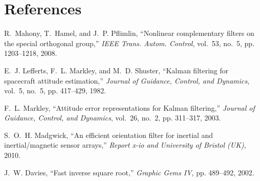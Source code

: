 \documentclass[12pt]{article}
\begin{document}
\section*{References}
\begin{thebibliography}{9}
R.~Mahony, T.~Hamel, and J.~P. Pflimlin, “Nonlinear complementary filters on the special orthogonal group,” \emph{IEEE Trans. Autom. Control}, vol.~53, no.~5, pp. 1203–1218, 2008.

E.~J. Lefferts, F.~L. Markley, and M.~D. Shuster, “Kalman filtering for spacecraft attitude estimation,” \emph{Journal of Guidance, Control, and Dynamics}, vol.~5, no.~5, pp. 417–429, 1982.

F.~L. Markley, “Attitude error representations for Kalman filtering,” \emph{Journal of Guidance, Control, and Dynamics}, vol.~26, no.~2, pp. 311–317, 2003.

S.~O.~H. Madgwick, “An efficient orientation filter for inertial and inertial/magnetic sensor arrays,” \emph{Report x-io and University of Bristol (UK)}, 2010.

J.~W. Davies, “Fast inverse square root,” \emph{Graphic Gems IV}, pp. 489–492, 2002.

\end{thebibliography}
\end{document}
